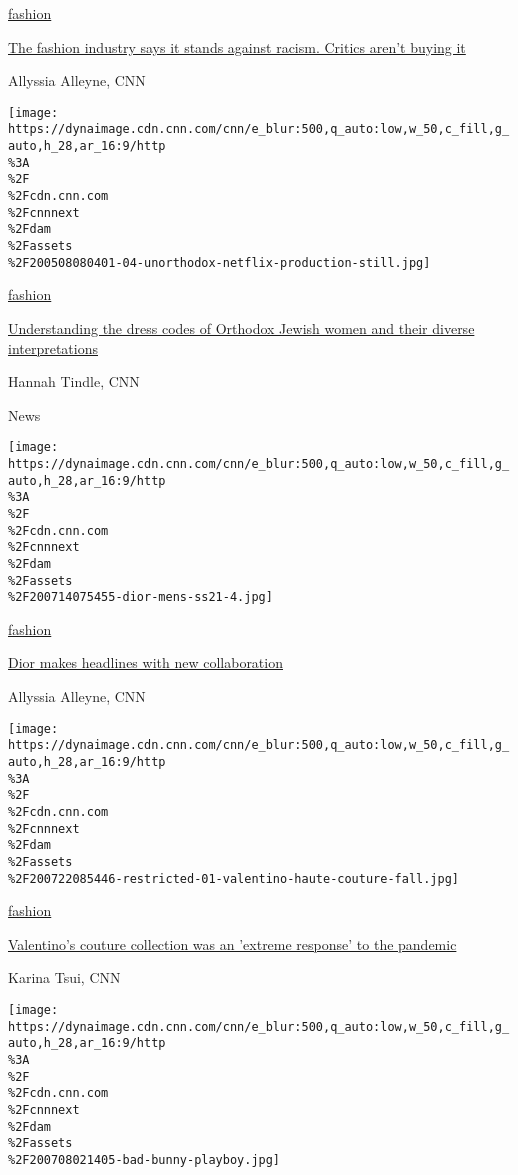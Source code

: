 \href{/style/fashion}{fashion}

\href{/style/article/fashion-industry-black-lives-matter/index.html}{The
fashion industry says it stands against racism. Critics aren't buying
it}

Allyssia Alleyne, CNN

\href{/style/article/orthodox-jewish-dress-codes/index.html}{}

\texttt{[image: https://dynaimage.cdn.cnn.com/cnn/e\_blur:500,q\_auto:low,w\_50,c\_fill,g\_auto,h\_28,ar\_16:9/http\\\%3A\\\%2F\\\%2Fcdn.cnn.com\\\%2Fcnnnext\\\%2Fdam\\\%2Fassets\\\%2F200508080401-04-unorthodox-netflix-production-still.jpg]}

\href{/style/fashion}{fashion}

\href{/style/article/orthodox-jewish-dress-codes/index.html}{Understanding
the dress codes of Orthodox Jewish women and their diverse
interpretations}

Hannah Tindle, CNN

News

\href{/style/article/dior-men-spring-summer-2021-amoako-boafo/index.html}{}

\texttt{[image: https://dynaimage.cdn.cnn.com/cnn/e\_blur:500,q\_auto:low,w\_50,c\_fill,g\_auto,h\_28,ar\_16:9/http\\\%3A\\\%2F\\\%2Fcdn.cnn.com\\\%2Fcnnnext\\\%2Fdam\\\%2Fassets\\\%2F200714075455-dior-mens-ss21-4.jpg]}

\href{/style/fashion}{fashion}

\href{/style/article/dior-men-spring-summer-2021-amoako-boafo/index.html}{Dior
makes headlines with new collaboration}

Allyssia Alleyne, CNN

\href{/style/article/valentino-haute-couture-fall/index.html}{}

\texttt{[image: https://dynaimage.cdn.cnn.com/cnn/e\_blur:500,q\_auto:low,w\_50,c\_fill,g\_auto,h\_28,ar\_16:9/http\\\%3A\\\%2F\\\%2Fcdn.cnn.com\\\%2Fcnnnext\\\%2Fdam\\\%2Fassets\\\%2F200722085446-restricted-01-valentino-haute-couture-fall.jpg]}

\href{/style/fashion}{fashion}

\href{/style/article/valentino-haute-couture-fall/index.html}{Valentino's
couture collection was an 'extreme response' to the pandemic}

Karina Tsui, CNN

\href{/style/article/bad-bunny-playboy-magazine/index.html}{}

\texttt{[image: https://dynaimage.cdn.cnn.com/cnn/e\_blur:500,q\_auto:low,w\_50,c\_fill,g\_auto,h\_28,ar\_16:9/http\\\%3A\\\%2F\\\%2Fcdn.cnn.com\\\%2Fcnnnext\\\%2Fdam\\\%2Fassets\\\%2F200708021405-bad-bunny-playboy.jpg]}

